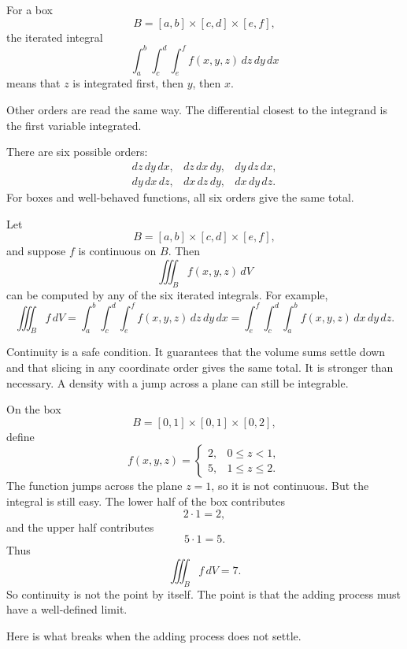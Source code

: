 \begin{definition}
For a box
\[
    B=[a,b]\times[c,d]\times[e,f],
\]
the iterated integral
\[
\boxed{
    \int_a^b\int_c^d\int_e^f f(x,y,z)\,dz\,dy\,dx
}
\]
means that \(z\) is integrated first, then \(y\), then \(x\).

Other orders are read the same way.  The differential closest to the integrand is the
first variable integrated.
\end{definition}

There are six possible orders:
\[
\begin{array}{ccc}
dz\,dy\,dx, & dz\,dx\,dy, & dy\,dz\,dx,\\[1mm]
dy\,dx\,dz, & dx\,dz\,dy, & dx\,dy\,dz.
\end{array}
\]
For boxes and well-behaved functions, all six orders give the same total.

\begin{theorem}
Let
\[
    B=[a,b]\times[c,d]\times[e,f],
\]
and suppose \(f\) is continuous on \(B\).  Then
\[
\boxed{
    \iiint_B f(x,y,z)\,dV
}
\]
can be computed by any of the six iterated integrals.  For example,
\[
\boxed{
\iiint_B f\,dV
=
\int_a^b\int_c^d\int_e^f f(x,y,z)\,dz\,dy\,dx
=
\int_e^f\int_c^d\int_a^b f(x,y,z)\,dx\,dy\,dz.
}
\]
\end{theorem}

Continuity is a safe condition.  It guarantees that the volume sums settle down and that
slicing in any coordinate order gives the same total.  It is stronger than necessary.  A
density with a jump across a plane can still be integrable.

\begin{example}
On the box
\[
    B=[0,1]\times[0,1]\times[0,2],
\]
define
\[
    f(x,y,z)=
    \begin{cases}
    2, & 0\le z<1,\\
    5, & 1\le z\le2.
    \end{cases}
\]
The function jumps across the plane \(z=1\), so it is not continuous.  But the integral
is still easy.  The lower half of the box contributes
\[
    2\cdot 1=2,
\]
and the upper half contributes
\[
    5\cdot 1=5.
\]
Thus
\[
\boxed{
    \iiint_B f\,dV=7.
}
\]
So continuity is not the point by itself.  The point is that the adding process must have
a well-defined limit.
\end{example}

Here is what breaks when the adding process does not settle.

